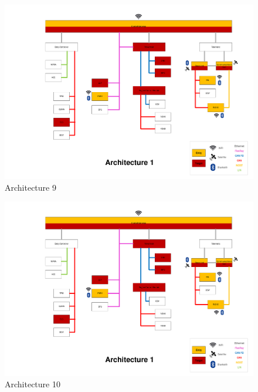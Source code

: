 \begin{figure}
    \caption{Architecture 9}
    \includegraphics[width=\textwidth, page=9]{../Architectures-survey.pdf}
\end{figure}

\begin{figure}
    \caption{Architecture 10}
    \includegraphics[width=\textwidth, page=10]{../Architectures-survey.pdf}
\end{figure}

